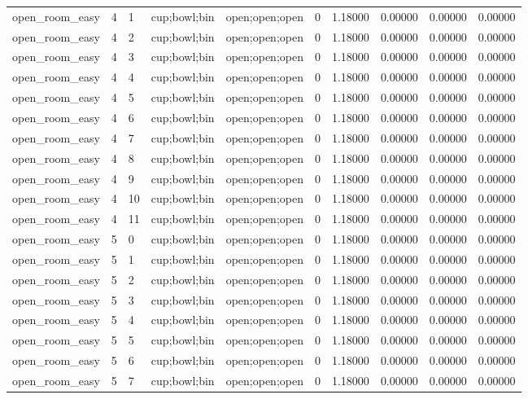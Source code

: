 \documentclass{article}
\begin{document}
\begin{table}[tbp]
{\begin{tabular}{llllllllll}
open\_room\_easy & 4 & 1 & cup;bowl;bin & open;open;open & 0 & 1.18000 & 0.00000 & 0.00000 & 0.00000 \\
open\_room\_easy & 4 & 2 & cup;bowl;bin & open;open;open & 0 & 1.18000 & 0.00000 & 0.00000 & 0.00000 \\
open\_room\_easy & 4 & 3 & cup;bowl;bin & open;open;open & 0 & 1.18000 & 0.00000 & 0.00000 & 0.00000 \\
open\_room\_easy & 4 & 4 & cup;bowl;bin & open;open;open & 0 & 1.18000 & 0.00000 & 0.00000 & 0.00000 \\
open\_room\_easy & 4 & 5 & cup;bowl;bin & open;open;open & 0 & 1.18000 & 0.00000 & 0.00000 & 0.00000 \\
open\_room\_easy & 4 & 6 & cup;bowl;bin & open;open;open & 0 & 1.18000 & 0.00000 & 0.00000 & 0.00000 \\
open\_room\_easy & 4 & 7 & cup;bowl;bin & open;open;open & 0 & 1.18000 & 0.00000 & 0.00000 & 0.00000 \\
open\_room\_easy & 4 & 8 & cup;bowl;bin & open;open;open & 0 & 1.18000 & 0.00000 & 0.00000 & 0.00000 \\
open\_room\_easy & 4 & 9 & cup;bowl;bin & open;open;open & 0 & 1.18000 & 0.00000 & 0.00000 & 0.00000 \\
open\_room\_easy & 4 & 10 & cup;bowl;bin & open;open;open & 0 & 1.18000 & 0.00000 & 0.00000 & 0.00000 \\
open\_room\_easy & 4 & 11 & cup;bowl;bin & open;open;open & 0 & 1.18000 & 0.00000 & 0.00000 & 0.00000 \\
open\_room\_easy & 5 & 0 & cup;bowl;bin & open;open;open & 0 & 1.18000 & 0.00000 & 0.00000 & 0.00000 \\
open\_room\_easy & 5 & 1 & cup;bowl;bin & open;open;open & 0 & 1.18000 & 0.00000 & 0.00000 & 0.00000 \\
open\_room\_easy & 5 & 2 & cup;bowl;bin & open;open;open & 0 & 1.18000 & 0.00000 & 0.00000 & 0.00000 \\
open\_room\_easy & 5 & 3 & cup;bowl;bin & open;open;open & 0 & 1.18000 & 0.00000 & 0.00000 & 0.00000 \\
open\_room\_easy & 5 & 4 & cup;bowl;bin & open;open;open & 0 & 1.18000 & 0.00000 & 0.00000 & 0.00000 \\
open\_room\_easy & 5 & 5 & cup;bowl;bin & open;open;open & 0 & 1.18000 & 0.00000 & 0.00000 & 0.00000 \\
open\_room\_easy & 5 & 6 & cup;bowl;bin & open;open;open & 0 & 1.18000 & 0.00000 & 0.00000 & 0.00000 \\
open\_room\_easy & 5 & 7 & cup;bowl;bin & open;open;open & 0 & 1.18000 & 0.00000 & 0.00000 & 0.00000 \\
\bottomrule
\end{tabular}
}
\end{table}
\end{document}
